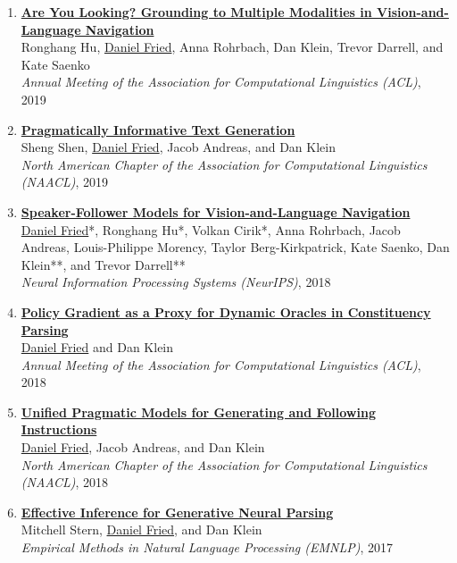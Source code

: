 \begin{enumerate}[leftmargin=-1mm,partopsep=0pt]
\item \href{https://arxiv.org/abs/1906.00347}{\textbf{Are You Looking? Grounding to Multiple Modalities in Vision-and-Language Navigation}} \\
  Ronghang Hu, \underline{Daniel Fried}, Anna Rohrbach, Dan Klein, Trevor Darrell, and Kate Saenko\\
  \emph{Annual Meeting of the Association for Computational Linguistics (ACL)}, 2019

\item \href{https://arxiv.org/abs/1904.01301}{\textbf{Pragmatically Informative Text Generation}} \\
  Sheng Shen, \underline{Daniel Fried}, Jacob Andreas, and Dan Klein\\
  \emph{North American Chapter of the Association for Computational Linguistics (NAACL)}, 2019

\item \href{https://arxiv.org/abs/1806.02724}{\textbf{Speaker-Follower Models for Vision-and-Language Navigation}} \\
  \underline{Daniel Fried}*, Ronghang Hu*, Volkan Cirik*, Anna Rohrbach, Jacob Andreas, Louis-Philippe Morency, Taylor Berg-Kirkpatrick, Kate Saenko, Dan Klein**, and Trevor Darrell** \\
  \emph{Neural Information Processing Systems (NeurIPS)}, 2018

\item \href{https://arxiv.org/abs/1806.03290}{\textbf{Policy Gradient as a Proxy for Dynamic Oracles in Constituency Parsing}} \\
  \underline{Daniel Fried} and Dan Klein\\
  \emph{Annual Meeting of the Association for Computational Linguistics (ACL)}, 2018

\item \href{https://arxiv.org/abs/1711.04987}{\textbf{Unified Pragmatic Models for Generating and Following Instructions}} \\
  \underline{Daniel Fried}, Jacob Andreas, and Dan Klein\\
  \emph{North American Chapter of the Association for Computational Linguistics (NAACL)}, 2018

\item \href{http://arxiv.org/abs/1707.08976}{\textbf{Effective Inference for Generative Neural Parsing}} \\
  Mitchell Stern, \underline{Daniel Fried}, and Dan Klein\\
  \emph{Empirical Methods in Natural Language Processing (EMNLP)}, 2017


\end{enumerate}
